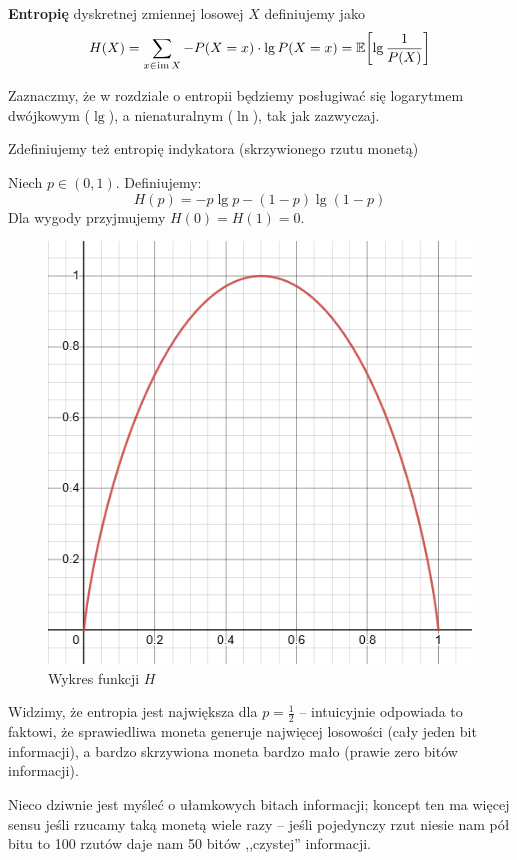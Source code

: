 \begin{definition}
    \textbf{Entropię} dyskretnej zmiennej losowej \( X\) definiujemy jako
    \[
        H(X) = \sum_{x \in \im X} -P(X = x) \cdot \lg P(X = x) = \expected{\lg \frac{1}{P(X)}}
    \]
\end{definition}
Zaznaczmy, że w rozdziale o entropii będziemy posługiwać się logarytmem dwójkowym (\( \lg \)), a nienaturalnym (\( \ln \)), tak jak zazwyczaj.

Zdefiniujemy też entropię indykatora (skrzywionego rzutu monetą)
\begin{definition}
    Niech \( p \in (0, 1) \). Definiujemy:
    \[
        H(p) = -p \lg p - (1-p) \lg (1-p)
    \]
    Dla wygody przyjmujemy \( H(0) = H(1) = 0 \).
\end{definition}
\begin{figure}[H]
    \centering
    \includegraphics[scale=0.5]{img/entropy/entropy-plot.png}
    \caption{Wykres funkcji \( H \)}
\end{figure}

Widzimy, że entropia jest największa dla \(p = \frac{1}{2} \) -- intuicyjnie odpowiada to faktowi, że sprawiedliwa moneta generuje najwięcej losowości (cały jeden bit informacji), a bardzo skrzywiona moneta bardzo mało (prawie zero bitów informacji). 

Nieco dziwnie jest myśleć o ułamkowych bitach informacji; koncept ten ma więcej sensu jeśli rzucamy taką monetą wiele razy -- jeśli pojedynczy rzut niesie nam pół bitu to 100 rzutów daje nam 50 bitów ,,czystej'' informacji. 

